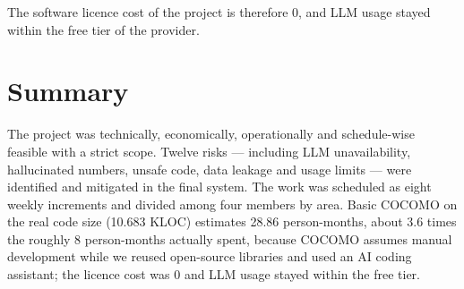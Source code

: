 The software licence cost of the project is therefore \rupee{}0, and LLM usage stayed within the free tier of the provider.

\FloatBarrier
\section{Summary}\label{sec:3.4}

The project was technically, economically, operationally and schedule-wise feasible with a strict scope. Twelve risks --- including LLM unavailability, hallucinated numbers, unsafe code, data leakage and usage limits --- were identified and mitigated in the final system. The work was scheduled as eight weekly increments and divided among four members by area. Basic COCOMO on the real code size (10.683 KLOC) estimates 28.86 person-months, about 3.6 times the roughly 8 person-months actually spent, because COCOMO assumes manual development while we reused open-source libraries and used an AI coding assistant; the licence cost was \rupee{}0 and LLM usage stayed within the free tier.
